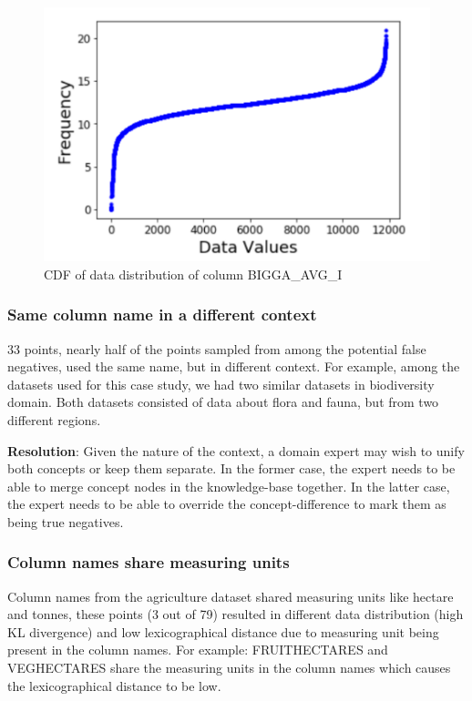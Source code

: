 \begin{figure}[H]
	\centering
	\includegraphics[width=0.8\columnwidth]{graphics/Challenge1_2}
	\caption{CDF of data distribution of column BIGGA\_AVG\_I}
	\label{fig:Distribution 2}
\end{figure}

\subsubsection{Same column name in a different context}
33 points, nearly half of the points sampled from among the potential false negatives, used the same name, but in different context.
For example, among the datasets used for this case study, we had two similar datasets in biodiversity domain. 
Both datasets consisted of data about flora and fauna, but from two different regions.

\textbf{Resolution}: Given the nature of the context, a domain expert may wish to unify both concepts or keep them separate.
In the former case, the expert needs to be able to merge concept nodes in the knowledge-base together.  
In the latter case, the expert needs to be able to override the concept-difference to mark them as being true negatives.

\subsubsection{Column names share measuring units}
Column names from the agriculture dataset shared measuring units like hectare and tonnes, these points (3 out of 79) resulted in different data distribution (high KL divergence) and low lexicographical distance due to measuring unit being present in the column names. For example: FRUITHECTARES and VEGHECTARES share the measuring units in the column names which causes the lexicographical distance to be low.

